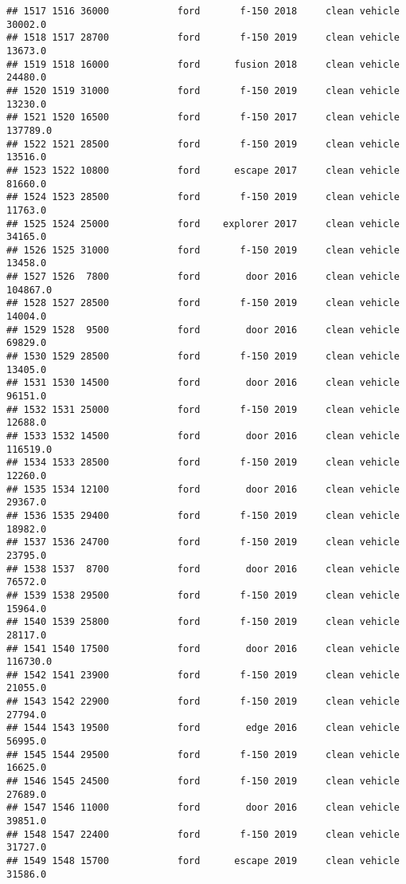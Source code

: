 \documentclass[
]{article}
\begin{document}
\begin{verbatim}
## 1517 1516 36000            ford       f-150 2018     clean vehicle   30002.0
## 1518 1517 28700            ford       f-150 2019     clean vehicle   13673.0
## 1519 1518 16000            ford      fusion 2018     clean vehicle   24480.0
## 1520 1519 31000            ford       f-150 2019     clean vehicle   13230.0
## 1521 1520 16500            ford       f-150 2017     clean vehicle  137789.0
## 1522 1521 28500            ford       f-150 2019     clean vehicle   13516.0
## 1523 1522 10800            ford      escape 2017     clean vehicle   81660.0
## 1524 1523 28500            ford       f-150 2019     clean vehicle   11763.0
## 1525 1524 25000            ford    explorer 2017     clean vehicle   34165.0
## 1526 1525 31000            ford       f-150 2019     clean vehicle   13458.0
## 1527 1526  7800            ford        door 2016     clean vehicle  104867.0
## 1528 1527 28500            ford       f-150 2019     clean vehicle   14004.0
## 1529 1528  9500            ford        door 2016     clean vehicle   69829.0
## 1530 1529 28500            ford       f-150 2019     clean vehicle   13405.0
## 1531 1530 14500            ford        door 2016     clean vehicle   96151.0
## 1532 1531 25000            ford       f-150 2019     clean vehicle   12688.0
## 1533 1532 14500            ford        door 2016     clean vehicle  116519.0
## 1534 1533 28500            ford       f-150 2019     clean vehicle   12260.0
## 1535 1534 12100            ford        door 2016     clean vehicle   29367.0
## 1536 1535 29400            ford       f-150 2019     clean vehicle   18982.0
## 1537 1536 24700            ford       f-150 2019     clean vehicle   23795.0
## 1538 1537  8700            ford        door 2016     clean vehicle   76572.0
## 1539 1538 29500            ford       f-150 2019     clean vehicle   15964.0
## 1540 1539 25800            ford       f-150 2019     clean vehicle   28117.0
## 1541 1540 17500            ford        door 2016     clean vehicle  116730.0
## 1542 1541 23900            ford       f-150 2019     clean vehicle   21055.0
## 1543 1542 22900            ford       f-150 2019     clean vehicle   27794.0
## 1544 1543 19500            ford        edge 2016     clean vehicle   56995.0
## 1545 1544 29500            ford       f-150 2019     clean vehicle   16625.0
## 1546 1545 24500            ford       f-150 2019     clean vehicle   27689.0
## 1547 1546 11000            ford        door 2016     clean vehicle   39851.0
## 1548 1547 22400            ford       f-150 2019     clean vehicle   31727.0
## 1549 1548 15700            ford      escape 2019     clean vehicle   31586.0

\end{verbatim}
\end{document}
